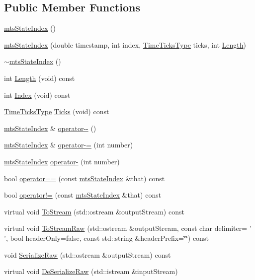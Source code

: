 \subsection*{Public Member Functions}
\begin{DoxyCompactItemize}
\item 
\hyperlink{classmts_state_index_aef0bef10b969db03fa40817c316227f5}{mts\-State\-Index} ()
\item 
\hyperlink{classmts_state_index_a03e7f263594442b60da5bab69406c3fa}{mts\-State\-Index} (double timestamp, int index, \hyperlink{classmts_state_index_a80d0a5acdec3b616347ddea2912b6294}{Time\-Ticks\-Type} ticks, int \hyperlink{classmts_state_index_a7edfd9644598e469b2a4e6161b15d9b6}{Length})
\item 
\hyperlink{classmts_state_index_afb7ff083d182f2dba64dc183292ddfd2}{$\sim$mts\-State\-Index} ()
\item 
int \hyperlink{classmts_state_index_a7edfd9644598e469b2a4e6161b15d9b6}{Length} (void) const 
\item 
int \hyperlink{classmts_state_index_ac117e13b981b49408776af1b53dfa09c}{Index} (void) const 
\item 
\hyperlink{classmts_state_index_a80d0a5acdec3b616347ddea2912b6294}{Time\-Ticks\-Type} \hyperlink{classmts_state_index_af3cc32958c37bae9e7d658b9a94655e2}{Ticks} (void) const 
\item 
\hyperlink{classmts_state_index}{mts\-State\-Index} \& \hyperlink{classmts_state_index_adf83691b3fc4a5676685ce24192549f4}{operator-\/-\/} ()
\item 
\hyperlink{classmts_state_index}{mts\-State\-Index} \& \hyperlink{classmts_state_index_a1d41bc34a81a7b327f0e861e8a94a382}{operator-\/=} (int number)
\item 
\hyperlink{classmts_state_index}{mts\-State\-Index} \hyperlink{classmts_state_index_abff1cc39caae8dd968f73ad546cf5095}{operator-\/} (int number)
\item 
bool \hyperlink{classmts_state_index_a7adcfadae2d8422c6f585b82fd5ca084}{operator==} (const \hyperlink{classmts_state_index}{mts\-State\-Index} \&that) const 
\item 
bool \hyperlink{classmts_state_index_aaec271010e78d34917aab1674216ade5}{operator!=} (const \hyperlink{classmts_state_index}{mts\-State\-Index} \&that) const 
\item 
virtual void \hyperlink{classmts_state_index_a3e16f00c85016723e04052e03a2547ec}{To\-Stream} (std\-::ostream \&output\-Stream) const 
\item 
virtual void \hyperlink{classmts_state_index_adbe9ecadbcdf1321b8c6c37235490def}{To\-Stream\-Raw} (std\-::ostream \&output\-Stream, const char delimiter= ' ', bool header\-Only=false, const std\-::string \&header\-Prefix=\char`\"{}\char`\"{}) const 
\item 
void \hyperlink{classmts_state_index_a805bdf14ee35773a9b1212599ba959c8}{Serialize\-Raw} (std\-::ostream \&output\-Stream) const 
\item 
virtual void \hyperlink{classmts_state_index_a431ca694480fa7568b5384187d139402}{De\-Serialize\-Raw} (std\-::istream \&input\-Stream)
\end{DoxyCompactItemize}


